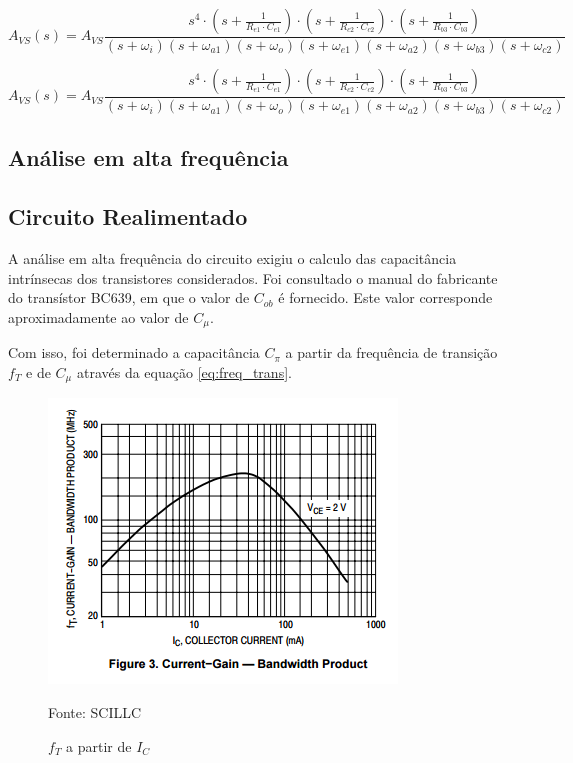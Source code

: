 \documentclass[openright]{normas-utf-tex} %
\begin{document}
\begin{equation}\label{eq:freq_b_m_sem_real}
A_{VS}(s) = A_{VS}\frac{s^4 \cdot \left(s+\frac{1}{R_{e1}\cdot C_{e1}}\right)\cdot \left(s+\frac{1}{R_{c2}\cdot C_{c2}}\right)\cdot \left(s+\frac{1}{R_{b3}\cdot C_{b3}}\right)}{\left(s+\omega_i\right)\left(s+\omega_{a1}\right)\left(s+\omega_o\right)\left(s+\omega_{e1}\right)\left(s+\omega_{a2}\right)\left(s+\omega_{b3}\right)\left(s+\omega_{c2}\right)}
\end{equation}

\begin{equation}\label{eq:freq_b_m_sem_real}
A_{VS}(s) = A_{VS} \frac{s^4 \cdot \left(s+\frac{1}{R_{e1}\cdot C_{e1}}\right)\cdot \left(s+\frac{1}{R_{c2}\cdot C_{c2}}\right)\cdot \left(s+\frac{1}{R_{b3}\cdot C_{b3}}\right)}{\left(s+\omega_i\right)\left(s+\omega_{a1}\right)\left(s+\omega_o\right)\left(s+\omega_{e1}\right)\left(s+\omega_{a2}\right)\left(s+\omega_{b3}\right)\left(s+\omega_{c2}\right)}
\end{equation}



\subsection{Análise em alta frequência}

\subsection{Circuito Realimentado}
A análise em alta frequência do circuito exigiu o calculo das capacitância intrínsecas dos transistores considerados. Foi consultado o manual do fabricante do transístor BC639, em que o valor de $C_{ob}$ é fornecido. Este valor corresponde aproximadamente ao valor de $C_\mu$.

Com isso, foi determinado a capacitância $C_\pi$ a partir da frequência de transição $f_T$ e de $C_\mu$ através da equação \ref{eq:freq_trans}. 

\begin{figure}[H]
\centering
\includegraphics[width=0.75\linewidth]{img/bandwith_product_ft.png}
\caption{$f_T$ a partir de $I_C$}
Fonte: SCILLC
\label{fig:fT_apartid_IC}
\end{figure}
\end{document}
